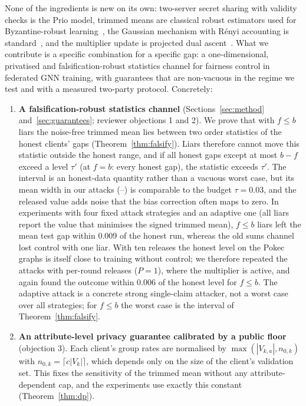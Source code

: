 None of the ingredients is new on its own: two-server secret sharing with validity checks is the Prio model, trimmed means are classical robust estimators used for Byzantine-robust learning~\citep{yin2018byzantine}, the Gaussian mechanism with R\'enyi accounting is standard~\citep{mironov2017renyi}, and the multiplier update is projected dual ascent~\citep{cotter2019optimization}. What we contribute is a specific combination for a specific gap: a one-dimensional, privatised and falsification-robust statistics channel for fairness control in federated GNN training, with guarantees that are non-vacuous in the regime we test and with a measured two-party protocol. Concretely:
\begin{enumerate}
\item \textbf{A falsification-robust statistics channel} (Sections~\ref{sec:method} and~\ref{sec:guarantees}; reviewer objections 1 and 2). We prove that with $f\le b$ liars the noise-free trimmed mean lies between two order statistics of the honest clients' gaps (Theorem~\ref{thm:falsify}). Liars therefore cannot move this statistic outside the honest range, and if all honest gaps except at most $b-f$ exceed a level $\tau'$ (at $f=b$: every honest gap), the statistic exceeds $\tau'$. The interval is an honest-data quantity rather than a vacuous worst case, but its mean width in our attacks (\spreadMin--\spreadMax) is comparable to the budget $\tau=0.03$, and the released value adds noise that the bias correction often maps to zero. In experiments with four fixed attack strategies and an adaptive one (all liars report the value that minimises the signed trimmed mean), $f\le b$ liars left the mean test gap within 0.009 of the honest run, whereas the old sums channel lost control with one liar. With ten releases the honest level on the Pokec graphs is itself close to training without control; we therefore repeated the attacks with per-round releases ($P=1$), where the multiplier is active, and again found the outcome within 0.006 of the honest level for $f\le b$. The adaptive attack is a concrete strong single-claim attacker, not a worst case over all strategies; for $f\le b$ the worst case is the interval of Theorem~\ref{thm:falsify}.
\item \textbf{An attribute-level privacy guarantee calibrated by a public floor} (objection 3). Each client's group rates are normalised by $\max(|V_{k,a}|,n_{0,k})$ with $n_{0,k}=\lceil c|V_k|\rceil$, which depends only on the size of the client's validation set. This fixes the sensitivity of the trimmed mean without any attribute-dependent cap, and the experiments use exactly this constant (Theorem~\ref{thm:dp}).

\end{enumerate}
